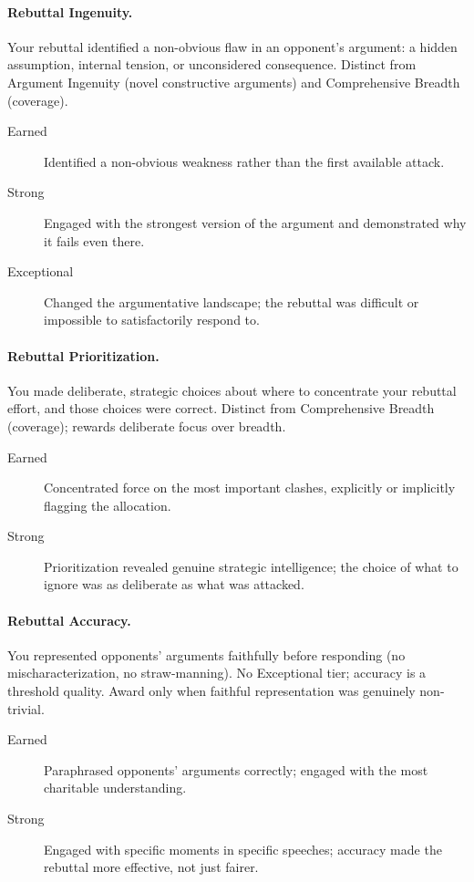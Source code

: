 \documentclass[12pt]{article}
\begin{document}
\paragraph{Rebuttal Ingenuity.} Your rebuttal identified a non-obvious flaw in an opponent's argument: a hidden assumption, internal tension, or unconsidered consequence. Distinct from Argument Ingenuity (novel constructive arguments) and Comprehensive Breadth (coverage).
\begin{description}
    \item[Earned] Identified a non-obvious weakness rather than the first available attack.
    \item[Strong] Engaged with the strongest version of the argument and demonstrated why it fails even there.
    \item[Exceptional] Changed the argumentative landscape; the rebuttal was difficult or impossible to satisfactorily respond to.
\end{description}

\paragraph{Rebuttal Prioritization.} You made deliberate, strategic choices about where to concentrate your rebuttal effort, and those choices were correct. Distinct from Comprehensive Breadth (coverage); rewards deliberate focus over breadth.
\begin{description}
    \item[Earned] Concentrated force on the most important clashes, explicitly or implicitly flagging the allocation.
    \item[Strong] Prioritization revealed genuine strategic intelligence; the choice of what to ignore was as deliberate as what was attacked.
\end{description}

\paragraph{Rebuttal Accuracy.} You represented opponents' arguments faithfully before responding (no mischaracterization, no straw-manning). No Exceptional tier; accuracy is a threshold quality. Award only when faithful representation was genuinely non-trivial.
\begin{description}
    \item[Earned] Paraphrased opponents' arguments correctly; engaged with the most charitable understanding.
    \item[Strong] Engaged with specific moments in specific speeches; accuracy made the rebuttal more effective, not just fairer.
\end{description}
\end{document}
